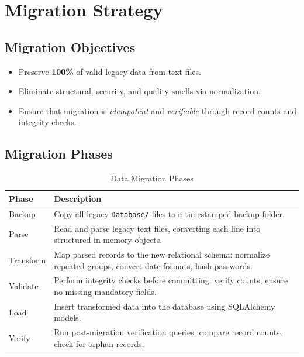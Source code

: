 \section{Migration Strategy}

\subsection{Migration Objectives}

\begin{itemize}
  \item Preserve \textbf{100\%} of valid legacy data from text files.
  \item Eliminate structural, security, and quality smells via normalization.
  \item Ensure that migration is \emph{idempotent} and \emph{verifiable}
        through record counts and integrity checks.
\end{itemize}

\subsection{Migration Phases}

\begin{table}[h]
  \centering
  \caption{Data Migration Phases}
  \begin{tabular}{p{3.0cm} p{9.7cm}}
    \toprule
    \textbf{Phase} & \textbf{Description} \\
    \midrule
    Backup &
      Copy all legacy \texttt{Database/} files to a timestamped backup folder. \\
    Parse &
      Read and parse legacy text files, converting each line into structured
      in-memory objects. \\
    Transform &
      Map parsed records to the new relational schema: normalize repeated groups,
      convert date formats, hash passwords. \\
    Validate &
      Perform integrity checks before committing: verify counts, ensure no
      missing mandatory fields. \\
    Load &
      Insert transformed data into the database using SQLAlchemy models. \\
    Verify &
      Run post-migration verification queries: compare record counts, check for
      orphan records. \\
    \bottomrule
  \end{tabular}
\end{table}

